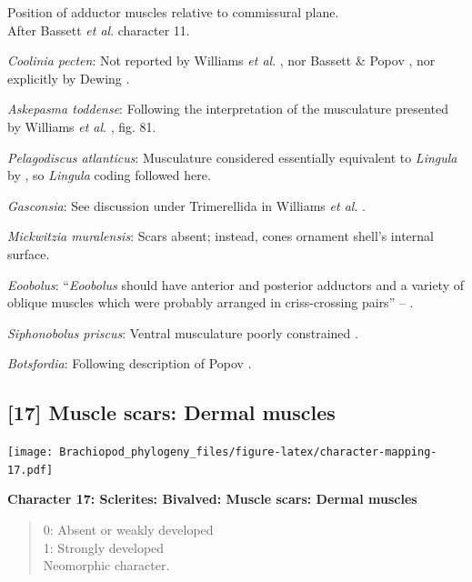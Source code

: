 \documentclass[openany]{book}
\theoremstyle{definition}
\theoremstyle{definition}
\theoremstyle{definition}
\theoremstyle{remark}
\begin{document}
Position of adductor muscles relative to commissural plane.\\
After Bassett \emph{et al}.
\citeyearpar{Bassett2001Functionalmorphology} character 11.

\emph{Coolinia pecten}: Not reported by Williams \emph{et al}.
\citeyearpar{Williams2000BrachiopodaLinguliformea}, nor Bassett \& Popov
\citeyearpar{Bassett2017Earliestontogeny}, nor explicitly by Dewing
\citeyearpar{Dewing2001Hingemodifications}.

\emph{Askepasma toddense}: Following the interpretation of the
musculature presented by Williams \emph{et al}.
\citeyearpar{Williams2000BrachiopodaLinguliformea}, fig. 81.

\emph{Pelagodiscus atlanticus}: Musculature considered essentially
equivalent to \emph{Lingula} by
\citet{Williams2000BrachiopodaLinguliformea}, so \emph{Lingula} coding
followed here.

\emph{Gasconsia}: See discussion under Trimerellida in Williams \emph{et
al}. \citeyearpar{Williams2000BrachiopodaLinguliformea}.

\emph{Mickwitzia muralensis}: Scars absent; instead, cones ornament
shell's internal surface.

\emph{Eoobolus}: ``\emph{Eoobolus} should have anterior and posterior
adductors and a variety of oblique muscles which were probably arranged
in criss-crossing pairs'' -- \citet{Balthasar2009Thebrachiopod}.

\emph{Siphonobolus priscus}: Ventral musculature poorly constrained
\citep{Williams2000BrachiopodaLinguliformea, Popov2009Earlyontogeny}.

\emph{Botsfordia}: Following description of Popov
\citeyearpar{Popov1992TheCambrian}.

\hypertarget{muscle-scars-dermal-muscles}{%
\subsection*{{[}17{]} Muscle scars: Dermal
muscles}\label{muscle-scars-dermal-muscles}}

\texttt{[image: Brachiopod\_phylogeny\_files/figure-latex/character-mapping-17.pdf]}

\textbf{Character 17: Sclerites: Bivalved: Muscle scars: Dermal muscles}

\begin{quote}
0: Absent or weakly developed\\
1: Strongly developed\\
Neomorphic character.
\end{quote}
\end{document}
